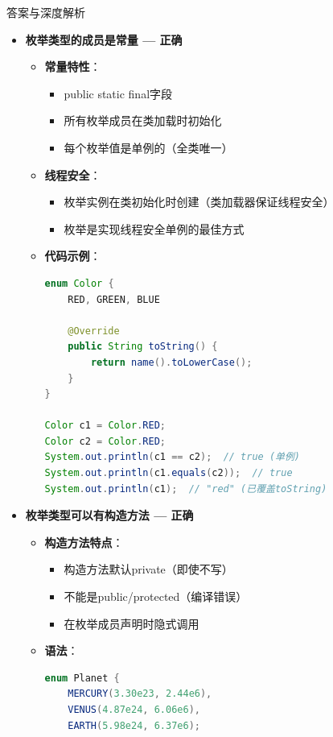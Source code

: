 \documentclass[12pt, a4paper]{ctexart}
\begin{document}
\begin{enumerate}[label=\textbf{\arabic*.}]
\begin{bluebox}{答案与深度解析}
\begin{itemize}[leftmargin=*, nosep, label={}]
			      \item[B] \textbf{枚举类型的成员是常量 — 正确}
			            \begin{itemize}[label={}, leftmargin=*, nosep]
				            \item \textbf{常量特性}：
				                  \begin{itemize}[label={}, nosep]
					                  \item public static final字段
					                  \item 所有枚举成员在类加载时初始化
					                  \item 每个枚举值是单例的（全类唯一）
				                  \end{itemize}
				            \item \textbf{线程安全}：
				                  \begin{itemize}[label={}, nosep]
					                  \item 枚举实例在类初始化时创建（类加载器保证线程安全）
					                  \item 枚举是实现线程安全单例的最佳方式
				                  \end{itemize}
				            \item \textbf{代码示例}：
				                  \begin{lstlisting}[language=Java]
enum Color {
    RED, GREEN, BLUE

    @Override
    public String toString() {
        return name().toLowerCase();
    }
}

Color c1 = Color.RED;
Color c2 = Color.RED;
System.out.println(c1 == c2);  // true (单例)
System.out.println(c1.equals(c2));  // true
System.out.println(c1);  // "red" (已覆盖toString)
				            \end{lstlisting}
			            \end{itemize}

			      \item[C] \textbf{枚举类型可以有构造方法 — 正确}
			            \begin{itemize}[label={}, leftmargin=*, nosep]
				            \item \textbf{构造方法特点}：
				                  \begin{itemize}[label={}, nosep]
					                  \item 构造方法默认private（即使不写）
					                  \item 不能是public/protected（编译错误）
					                  \item 在枚举成员声明时隐式调用
				                  \end{itemize}
				            \item \textbf{语法}：
				                  \begin{lstlisting}[language=Java]
enum Planet {
    MERCURY(3.30e23, 2.44e6),
    VENUS(4.87e24, 6.06e6),
    EARTH(5.98e24, 6.37e6);


\end{lstlisting}
\end{itemize}
\end{itemize}
\end{bluebox}
\end{enumerate}
\end{document}
